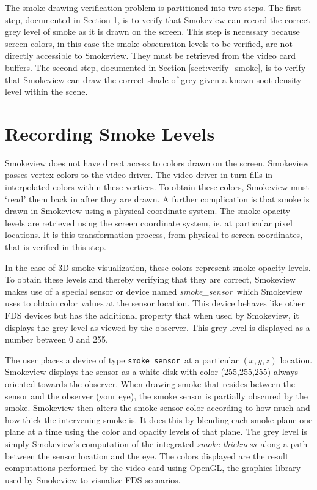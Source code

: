 \documentclass[11pt,twoside]{book}
\begin{document}
The smoke drawing verification problem is partitioned into two steps. The first step, documented in Section \ref{sect:record_smoke}, is to verify that Smokeview can record the correct grey level of smoke as it is drawn on the screen. This step is necessary because screen colors, in this case the smoke obscuration levels to be verified, are not directly accessible to Smokeview. They must be retrieved from the video card buffers. The second step, documented in Section \ref{sect:verify_smoke}, is to verify that Smokeview can draw the correct shade of grey given a known soot density level
within the scene.
\section{Recording Smoke Levels}
\label{sect:record_smoke}

Smokeview does not have direct access to colors drawn on the screen.  Smokeview passes vertex colors to the video driver. The video driver in turn fills in interpolated colors within these vertices. To obtain these colors, Smokeview must `read' them back in after they are drawn.  A further complication is that smoke is drawn in Smokeview using a physical coordinate system. The smoke opacity levels are retrieved using the screen coordinate system, ie. at particular pixel locations. It is this transformation process, from physical to screen coordinates, that is verified in this step.

In the case of 3D smoke visualization, these colors represent smoke opacity levels.  To obtain these levels and thereby verifying that they are correct, Smokeview makes use of a special sensor or device named {\em smoke\_sensor}\ which Smokeview uses to obtain color values at the sensor location. This device behaves like other FDS devices but has the additional property that when used by Smokeview, it displays the grey level as viewed by the observer.  This grey level is displayed as a number between 0 and 255.

The user places a device of type {\tt smoke\_sensor}\ at a particular $(x, y, z)$ location. Smokeview displays the sensor as a white disk with color (255,255,255) always oriented towards the observer. When drawing smoke that resides between the sensor and the observer (your eye), the smoke sensor is partially obscured by the smoke.  Smokeview then alters the smoke sensor color according to how much and how thick the intervening smoke is.  It does this by blending each smoke plane one plane at a time using the color and opacity levels of that plane. The grey level is simply Smokeview's computation of the integrated {\em smoke thickness}\ along a path between the sensor location and the eye.  The colors displayed are the result computations performed by the video card using OpenGL, the graphics library used by Smokeview to visualize FDS scenarios.
\end{document}
